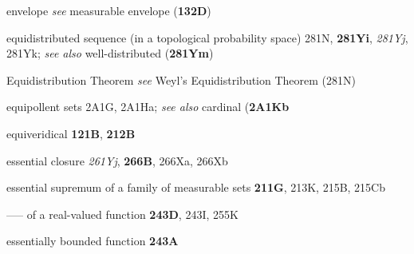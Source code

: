 





envelope {\it see}
measurable envelope ({\bf 132D})


















equidistributed sequence (in a topological probability space) 281N,
{\bf 281Yi}, {\it 281Yj}, 281Yk; 
  {\it see also}
  well-distributed ({\bf 281Ym})

  

Equidistribution Theorem {\it see} Weyl's Equidistribution Theorem
(281N)







equipollent sets 2A1G, 2A1Ha; 
  {\it see also} cardinal ({\bf 2A1Kb}










equiveridical {\bf 121B}, {\bf 212B}


























essential closure {\it 261Yj}, {\bf 266B}, 266Xa, 266Xb




essential supremum of a family of measurable sets {\bf 211G}, 213K,
215B, 215Cb


----- of a real-valued function {\bf 243D}, 243I, 255K


essentially bounded function {\bf 243A}






